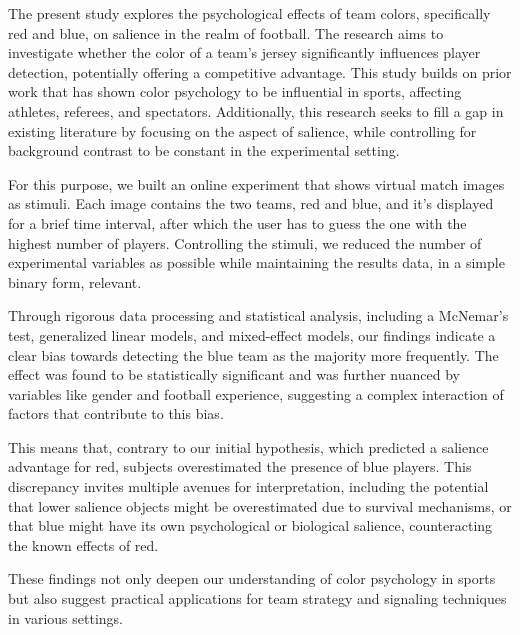The present study explores the psychological effects of team colors, specifically red and blue, on salience in the realm of football. The research aims to investigate whether the color of a team's jersey significantly influences player detection, potentially offering a competitive advantage. This study builds on prior work that has shown color psychology to be influential in sports, affecting athletes, referees, and spectators. Additionally, this research seeks to fill a gap in existing literature by focusing on the aspect of salience, while controlling for background contrast to be constant in the experimental setting.

For this purpose, we built an online experiment that shows virtual match images as stimuli. Each image contains the two teams, red and blue, and it's displayed for a brief time interval, after which the user has to guess the one with the highest number of players. Controlling the stimuli, we reduced the number of experimental variables as possible while maintaining the results data, in a simple binary form, relevant.

Through rigorous data processing and statistical analysis, including a McNemar's test, generalized linear models, and mixed-effect models, our findings indicate a clear bias towards detecting the blue team as the majority more frequently. The effect was found to be statistically significant and was further nuanced by variables like gender and football experience, suggesting a complex interaction of factors that contribute to this bias.

This means that, contrary to our initial hypothesis, which predicted a salience advantage for red, subjects overestimated the presence of blue players. This discrepancy invites multiple avenues for interpretation, including the potential that lower salience objects might be overestimated due to survival mechanisms, or that blue might have its own psychological or biological salience, counteracting the known effects of red.

These findings not only deepen our understanding of color psychology in sports but also suggest practical applications for team strategy and signaling techniques in various settings.

